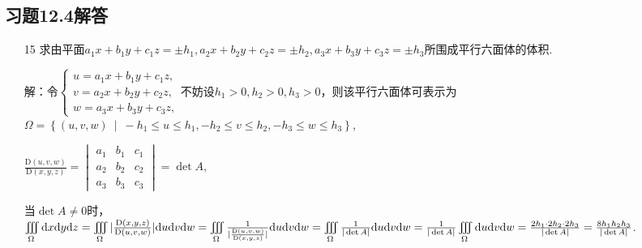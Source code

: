 \documentclass[12pt,UTF8]{ctexart}
\newcommand\Set[2]{\left\{#1\ \middle\vert\ #2 \right\}}
\newcommand{\varIIInt}[5]{\iiint\limits_{#1}#2\mathrm d#3\mathrm d#4\mathrm d#5}
\begin{document}
\subsection{习题12.4解答}
\begin{enumerate}
\item[15]求由平面$a_1x+b_1y+c_1z=\pm h_1,a_2x+b_2y+c_2z=\pm h_2,a_3x+b_3y+c_3z=\pm h_3$所围成平行六面体的体积.

解：令$\begin{cases}
u=a_1x+b_1y+c_1z,\\
v=a_2x+b_2y+c_2z,\\
w=a_3x+b_3y+c_3z,
\end{cases}$不妨设$h_1>0,h_2>0,h_3>0$，则该平行六面体可表示为$\Omega=\Set{(u,v,w)}{-h_1\leqslant u\leqslant h_1,-h_2\leqslant v\leqslant h_2,-h_3\leqslant w\leqslant h_3}$,

$\frac{\mathrm D(u,v,w)}{\mathrm D(x,y,z)}=\begin{vmatrix}
a_1&b_1&c_1\\
a_2&b_2&c_2\\
a_3&b_3&c_3
\end{vmatrix}=\det A$,

当$\det A\neq0$时，\\
$\varIIInt\Omega{}xyz=\varIIInt\Omega{|\frac{\mathrm D(x,y,z)}{\mathrm D(u,v,w)}|}uvw=\varIIInt\Omega{\frac1{|\frac{\mathrm D(u,v,w)}{\mathrm D(x,y,z)}|}}uvw=\varIIInt\Omega{\frac1{|\det A|}}uvw\\
=\frac1{|\det A|}\varIIInt\Omega{}uvw=\frac{2h_1\cdot2h_2\cdot2h_3}{|\det A|}=\frac{8h_1h_2h_3}{|\det A|}$.

\end{enumerate}
\end{document}
